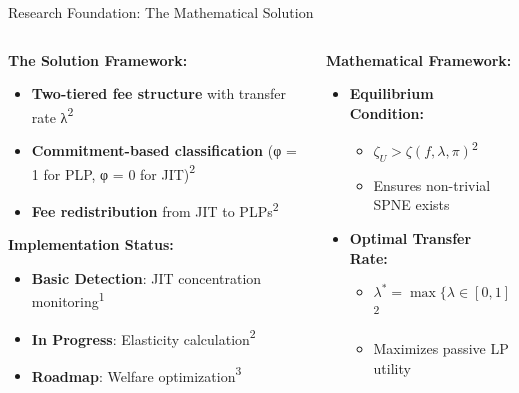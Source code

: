 \documentclass[aspectratio=169]{beamer}
\newcommand{\citeaquilina}{\textcolor{parityblue}{\textsuperscript{1}}}
\newcommand{\citecapponi}{\textcolor{paritygreen}{\textsuperscript{2}}}
\newcommand{\citema}{\textcolor{parityorange}{\textsuperscript{3}}}
\begin{document}
\begin{frame}{Research Foundation: The Mathematical Solution}
    \begin{columns}
        \begin{column}{0.5\textwidth}
            \textbf{The Solution Framework:}
            \begin{itemize}
                \item \textcolor{paritygreen}{\textbf{Two-tiered fee structure}} with transfer rate λ\citecapponi
                \item \textcolor{paritygreen}{\textbf{Commitment-based classification}} (φ = 1 for PLP, φ = 0 for JIT)\citecapponi
                \item \textcolor{paritygreen}{\textbf{Fee redistribution}} from JIT to PLPs\citecapponi
            \end{itemize}
            
            \vspace{0.5cm}
            \textbf{Implementation Status:}
            \begin{itemize}
                \item \textcolor{paritygreen}{\checkmark} \textbf{Basic Detection}: JIT concentration monitoring\citeaquilina
                \item \textcolor{parityorange}{\textbf{In Progress}}: Elasticity calculation\citecapponi
                \item \textcolor{parityblue}{\textbf{Roadmap}}: Welfare optimization\citema
            \end{itemize}
        \end{column}
        \begin{column}{0.5\textwidth}
            \textbf{Mathematical Framework:}
            \begin{itemize}
                \item \textcolor{parityblue}{\textbf{Equilibrium Condition:}}
                \begin{itemize}
                    \item $\zeta_U > \zeta(f, \lambda, \pi)$\citecapponi
                    \item Ensures non-trivial SPNE exists
                \end{itemize}
                
                \item \textcolor{parityblue}{\textbf{Optimal Transfer Rate:}}
                \begin{itemize}
                    \item $\lambda^* = \max\{\lambda \in [0,1] : U(\pi,\lambda) \geq 0\}$\citecapponi
                    \item Maximizes passive LP utility
                \end{itemize}
                

\end{itemize}
\end{column}
\end{columns}
\end{frame}
\end{document}
